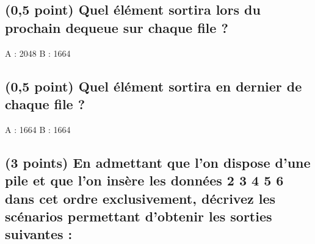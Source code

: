 \documentclass[11pt,a4paper]{article}
\begin{document}
\bigskip


\subsection{(0,5 point) Quel élément sortira lors du prochain \og dequeue \fg{} sur chaque file ? }

\bigskip
\bigskip

\begin{Large}
A : 2048 \hspace{7.5cm}  B : 1664
\end{Large}

\bigskip
\bigskip


\subsection{(0,5 point) Quel élément sortira en dernier de chaque file ? }

\bigskip
\bigskip

\begin{Large}
A : 1664 \hspace{7.5cm}  B : 1664
\end{Large}

\bigskip
\bigskip



\hspace{0pt}
\vfill

\newpage

\subsection{(3 points) En admettant que l'on dispose d'une pile et que l'on insère les données  2 3 4 5 6 \fg{} dans cet ordre exclusivement, décrivez les scénarios permettant d'obtenir les sorties suivantes : }
\end{document}
